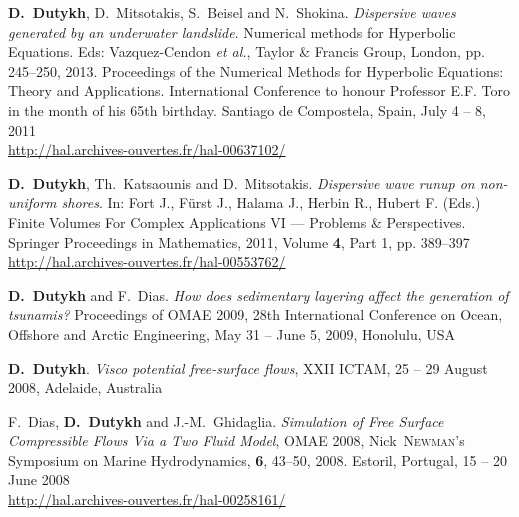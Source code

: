 \begin{etaremune}


  \item \textbf{D.~Dutykh}, D.~Mitsotakis, S.~Beisel and N.~Shokina. \textit{Dispersive waves generated by an underwater landslide}. Numerical methods for Hyperbolic Equations. Eds: Vazquez-Cendon \emph{et al.}, Taylor \& Francis Group, London, pp. 245--250, 2013. Proceedings of the Numerical Methods for Hyperbolic Equations: Theory and Applications. International Conference to honour Professor E.F. Toro in the month of his 65th birthday. Santiago de Compostela, Spain, July 4 -- 8, 2011 \\ %
  \url{http://hal.archives-ouvertes.fr/hal-00637102/}

  \item \textbf{D.~Dutykh}, Th.~Katsaounis and D.~Mitsotakis. \textit{Dispersive wave runup on non-uniform shores}. In: Fort J., F\"urst J., Halama J., Herbin R., Hubert F. (Eds.) Finite Volumes For Complex Applications VI --- Problems \& Perspectives. Springer Proceedings in Mathematics, 2011, Volume \textbf{4}, Part 1, pp. 389--397 \\ %
  \url{http://hal.archives-ouvertes.fr/hal-00553762/}
  


  \item \textbf{D.~Dutykh} and F.~Dias. \textit{How does sedimentary layering affect the generation of tsunamis?} Proceedings of OMAE 2009, 28th International Conference on Ocean, Offshore and Arctic Engineering, May 31 -- June 5, 2009, Honolulu, USA %
  


  \item \textbf{D.~Dutykh}. \textit{Visco potential free-surface flows}, XXII ICTAM, 25 -- 29 August 2008, Adelaide, Australia %
  
  \item F.~Dias, \textbf{D.~Dutykh} and J.-M.~Ghidaglia. \textit{Simulation of Free Surface Compressible Flows Via a Two Fluid Model}, OMAE 2008, Nick~\textsc{Newman}'s Symposium on Marine Hydrodynamics, \textbf{6}, 43--50, 2008. Estoril, Portugal, 15 -- 20 June 2008 \\ %
  \url{http://hal.archives-ouvertes.fr/hal-00258161/}
  
\end{etaremune}

